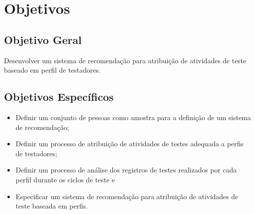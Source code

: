 \section{Objetivos}
\subsection{Objetivo Geral}

Desenvolver um sistema de recomendação para atribuição de atividades de teste baseado em perfil de testadores.

\subsection{Objetivos Específicos}

\begin{itemize}
		\item Definir um conjunto de pessoas como amostra para a definição de um sistema de recomendação;
 		\item Definir um processo de atribuição de atividades de testes adequada a perfis de testadores;
		\item Definir um processo de análise dos registros de testes realizados por cada perfil durante os ciclos de teste e
		\item Especificar um sistema de recomendação para atribuição de atividades de teste baseada em perfis. 
		

	\end{itemize}
